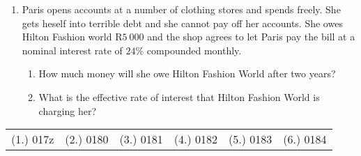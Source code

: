 \begin{eocexercises}{}
\begin{enumerate}
\item{Paris opens accounts at a number of clothing stores and spends freely.  She gets heself into terrible debt and she cannot pay off her accounts.  She owes Hilton Fashion world R$5~000$ and the shop agrees to let Paris pay the bill at a nominal interest rate of $24\%$ compounded monthly.
\begin{enumerate}
\item{How much money will she owe Hilton Fashion World after two years?}
\item{What is the effective rate of interest that Hilton Fashion World is charging her?}
\end{enumerate}}
\end{enumerate}



\practiceinfo
\par \begin{tabular}[h]{cccccc}
(1.)	017z	&
(2.)	0180	&
(3.)	0181	&
(4.)	0182	&
(5.)	0183	&
(6.)	0184	\\ %
\end{tabular}
\end{eocexercises}




